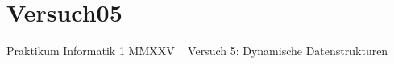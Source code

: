 \chapter{Versuch05}
\hypertarget{index}{}\label{index}
Praktikum Informatik 1 MMXXV ~\newline
 Versuch 5\+: Dynamische Datenstrukturen 